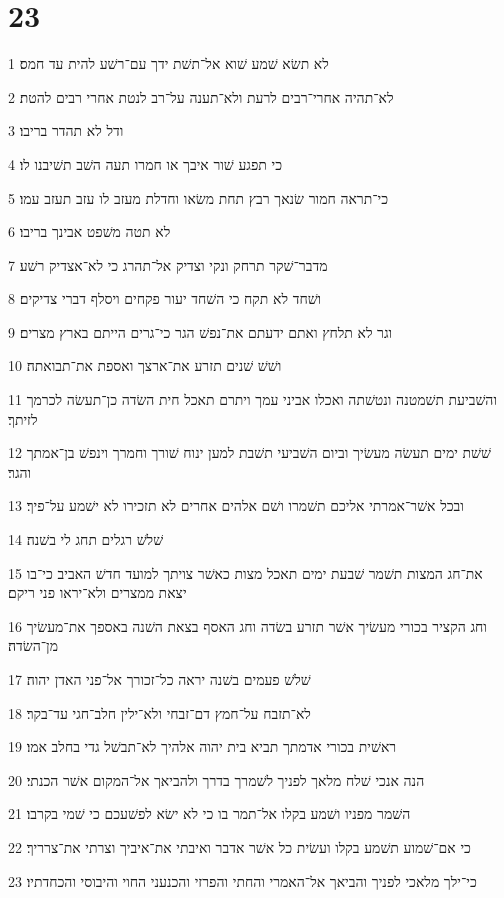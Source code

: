 \chapter{23}

\par 1 לא תשׂא שׁמע שׁוא אל־תשׁת ידך עם־רשׁע להית עד חמס׃
\par 2 לא־תהיה אחרי־רבים לרעת ולא־תענה על־רב לנטת אחרי רבים להטת׃
\par 3 ודל לא תהדר בריבו׃
\par 4 כי תפגע שׁור איבך או חמרו תעה השׁב תשׁיבנו לו׃
\par 5 כי־תראה חמור שׂנאך רבץ תחת משׂאו וחדלת מעזב לו עזב תעזב עמו׃
\par 6 לא תטה משׁפט אבינך בריבו׃
\par 7 מדבר־שׁקר תרחק ונקי וצדיק אל־תהרג כי לא־אצדיק רשׁע׃
\par 8 ושׁחד לא תקח כי השׁחד יעור פקחים ויסלף דברי צדיקים׃
\par 9 וגר לא תלחץ ואתם ידעתם את־נפשׁ הגר כי־גרים הייתם בארץ מצרים׃
\par 10 ושׁשׁ שׁנים תזרע את־ארצך ואספת את־תבואתה׃
\par 11 והשׁביעת תשׁמטנה ונטשׁתה ואכלו אביני עמך ויתרם תאכל חית השׂדה כן־תעשׂה לכרמך לזיתך׃
\par 12 שׁשׁת ימים תעשׂה מעשׂיך וביום השׁביעי תשׁבת למען ינוח שׁורך וחמרך וינפשׁ בן־אמתך והגר׃
\par 13 ובכל אשׁר־אמרתי אליכם תשׁמרו ושׁם אלהים אחרים לא תזכירו לא ישׁמע על־פיך׃
\par 14 שׁלשׁ רגלים תחג לי בשׁנה׃
\par 15 את־חג המצות תשׁמר שׁבעת ימים תאכל מצות כאשׁר צויתך למועד חדשׁ האביב כי־בו יצאת ממצרים ולא־יראו פני ריקם׃
\par 16 וחג הקציר בכורי מעשׂיך אשׁר תזרע בשׂדה וחג האסף בצאת השׁנה באספך את־מעשׂיך מן־השׂדה׃
\par 17 שׁלשׁ פעמים בשׁנה יראה כל־זכורך אל־פני האדן יהוה׃
\par 18 לא־תזבח על־חמץ דם־זבחי ולא־ילין חלב־חגי עד־בקר׃
\par 19 ראשׁית בכורי אדמתך תביא בית יהוה אלהיך לא־תבשׁל גדי בחלב אמו׃
\par 20 הנה אנכי שׁלח מלאך לפניך לשׁמרך בדרך ולהביאך אל־המקום אשׁר הכנתי׃
\par 21 השׁמר מפניו ושׁמע בקלו אל־תמר בו כי לא ישׂא לפשׁעכם כי שׁמי בקרבו׃
\par 22 כי אם־שׁמוע תשׁמע בקלו ועשׂית כל אשׁר אדבר ואיבתי את־איביך וצרתי את־צרריך׃
\par 23 כי־ילך מלאכי לפניך והביאך אל־האמרי והחתי והפרזי והכנעני החוי והיבוסי והכחדתיו׃
